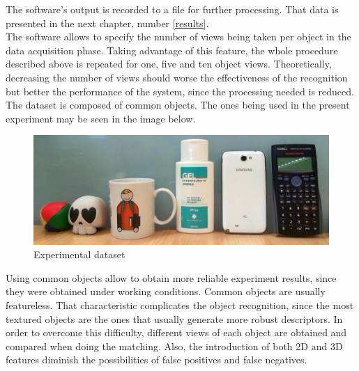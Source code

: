 		The software's output is recorded to a file for further processing. 
		That data is presented in the next chapter, number \ref{results}.
		\\

		The software allows to specify the number of views being taken per object in the data acquisition phase. 
		Taking advantage of this feature, the whole procedure described above is repeated for one, five and ten object views.
		Theoretically, decreasing the number of views should worse the effectiveness of the recognition but better the performance of the system, since the processing needed is reduced.
		\\%

		The dataset is composed of common objects. 
		The ones being used in the present experiment may be seen in the image below. 

		\begin{figure}[H]
				\begin{center}
			    \includegraphics[scale=0.35]{img/tests/dataset.jpg}
				\caption[Experimental dataset]{Experimental dataset}
				\end{center}
		\end{figure}


		Using common objects allow to obtain more reliable experiment results, since they were obtained under working conditions. 
		Common objects are usually featureless. 
		That characteristic complicates the object recognition, since the most textured objects are the ones that usually generate more robust descriptors. 
		In order to overcome this difficulty, different views of each object are obtained and compared when doing the matching. 
		Also, the introduction of both 2D and 3D features diminish the possibilities of false positives and false negatives. 
		\\%

